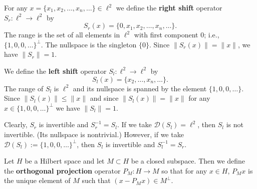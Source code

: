 \begin{Example}
\label{ex:right-left-shifts-domain-dependent-inverses}
For any $x=\{x_1,x_2,\ldots,x_n,\ldots\}\in\ell^2$ we define the \textbf{right shift} operator $S_r:\ell^2\to\ell^2$ by\[S_r(x)=\{0,x_1,x_2,\ldots,x_n,\ldots\}.\]The range is the set of all elements in $\ell^2$ with first component $0$; i.e., $\{1,0,0,\ldots\}^{\perp}$. The nullspace is the singleton $\{0\}$. Since $\|S_r(x)\|=\|x\|$, we have $\|S_r\|=1$.

We define the \textbf{left shift} operator $S_l:\ell^2\to\ell^2$ by\[S_l(x)=\{x_2,\ldots,x_n,\ldots\}.\]The range of $S_l$ is $\ell^2$ and its nullspace is spanned by the element $\{1,0,0,\ldots\}$. Since $\|S_l(x)\|\leq\|x\|$ and since $\|S_l(x)\|=\|x\|$ for any $x\in\{1,0,0,\ldots\}^{\perp}$ we have $\|S_l\|=1$.

Clearly, $S_r$ is invertible and $S_r^{-1}=S_l$. If we take $\mathcal{D}(S_l)=\ell^2$, then $S_l$ is not invertible. (Its nullspace is nontrivial.) However, if we take $\mathcal{D}(S_l):=\{1,0,0,\ldots\}^{\perp}$, then $S_l$ is invertible and $S_l^{-1}=S_r$.
\end{Example}

\begin{Example}
\label{ex:orthogonal-projection-operator}
Let $H$ be a Hilbert space and let $M\subset H$ be a closed subspace. Then we define the \textbf{orthogonal projection} operator $P_M:H\to M$ so that for any $x\in H$, $P_Mx$ is the unique element of $M$ such that $(x-P_Mx)\in M^{\perp}$.
\end{Example}
